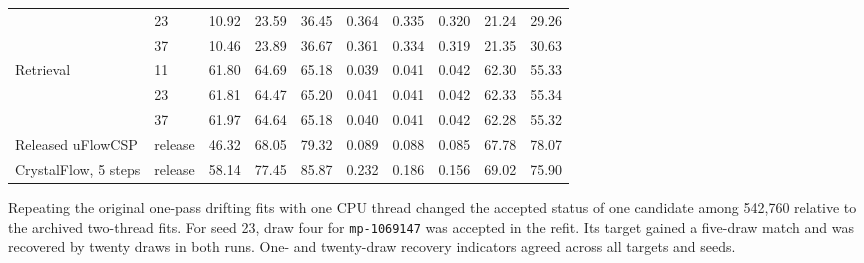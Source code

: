 \begin{table}[!htbp]
\begin{tabular}{llrrrrrrrr}
 & 23 & 10.92 & 23.59 & 36.45 & 0.364 & 0.335 & 0.320 & 21.24 & 29.26 \\
 & 37 & 10.46 & 23.89 & 36.67 & 0.361 & 0.334 & 0.319 & 21.35 & 30.63 \\
Retrieval & 11 & 61.80 & 64.69 & 65.18 & 0.039 & 0.041 & 0.042 & 62.30 & 55.33 \\
 & 23 & 61.81 & 64.47 & 65.20 & 0.041 & 0.041 & 0.042 & 62.33 & 55.34 \\
 & 37 & 61.97 & 64.64 & 65.18 & 0.040 & 0.041 & 0.042 & 62.28 & 55.32 \\
Released uFlowCSP & release & 46.32 & 68.05 & 79.32 & 0.089 & 0.088 & 0.085 & 67.78 & 78.07 \\
CrystalFlow, 5 steps & release & 58.14 & 77.45 & 85.87 & 0.232 & 0.186 & 0.156 & 69.02 & 75.90 \\
\hline\end{tabular}\end{table}
Repeating the original one-pass drifting fits with one CPU thread changed the accepted status of one candidate among 542,760 relative to the archived two-thread fits. For seed 23, draw four for \texttt{mp-1069147} was accepted in the refit. Its target gained a five-draw match and was recovered by twenty draws in both runs. One- and twenty-draw recovery indicators agreed across all targets and seeds.
